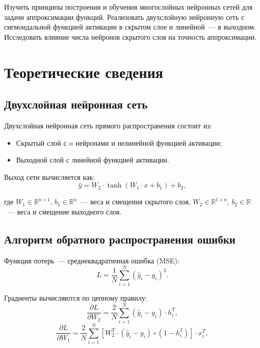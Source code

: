 \documentclass[14pt,a4paper]{extarticle}
\begin{document}
Изучить принципы построения и обучения многослойных нейронных сетей для задачи аппроксимации функций. Реализовать двухслойную нейронную сеть с сигмоидальной функцией активации в скрытом слое и линейной~--- в выходном. Исследовать влияние числа нейронов скрытого слоя на точность аппроксимации.

\section{Теоретические сведения}

\subsection{Двухслойная нейронная сеть}

Двухслойная нейронная сеть прямого распространения состоит из:
\begin{itemize}
\item Скрытый слой с $n$ нейронами и нелинейной функцией активации;
\item Выходной слой с линейной функцией активации.
\end{itemize}

Выход сети вычисляется как:
\begin{equation}
\hat{y} = W_2 \cdot \tanh(W_1 \cdot x + b_1) + b_2,
\end{equation}

где $W_1 \in \mathbb{R}^{n \times 1}$, $b_1 \in \mathbb{R}^n$~--- веса и смещения скрытого слоя, $W_2 \in \mathbb{R}^{1 \times n}$, $b_2 \in \mathbb{R}$~--- веса и смещение выходного слоя.

\subsection{Алгоритм обратного распространения ошибки}

Функция потерь~--- среднеквадратичная ошибка (MSE):
\begin{equation}
L = \frac{1}{N} \sum_{i=1}^{N} (\hat{y}_i - y_i)^2.
\end{equation}

Градиенты вычисляются по цепному правилу:
\begin{equation}
\frac{\partial L}{\partial W_2} = \frac{2}{N} \sum_{i=1}^{N} (\hat{y}_i - y_i) \cdot h_i^T,
\end{equation}
\begin{equation}
\frac{\partial L}{\partial W_1} = \frac{2}{N} \sum_{i=1}^{N} \left[ W_2^T \cdot (\hat{y}_i - y_i) \circ (1 - h_i^2) \right] \cdot x_i^T,
\end{equation}
\end{document}
